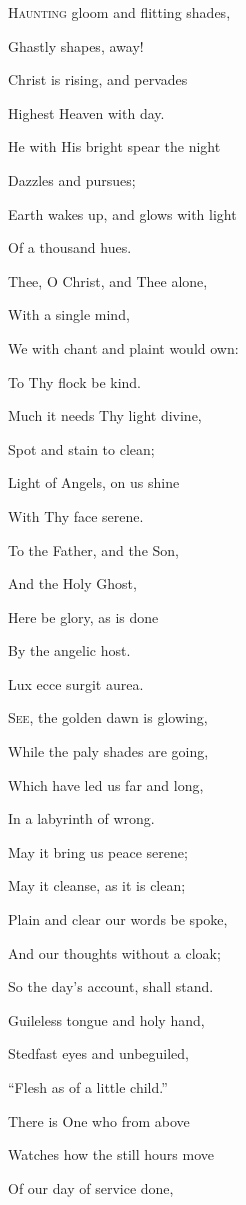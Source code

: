 H\textsc{aunting} gloom and flitting shades,

Ghastly shapes, away!

Christ is rising, and pervades

Highest Heaven with day.

He with His bright spear the night

Dazzles and pursues;

Earth wakes up, and glows with light

Of a thousand hues.

Thee, O Christ, and Thee alone,

With a single mind,

We with chant and plaint would own:

To Thy flock be kind. 

Much it needs Thy light divine,

Spot and stain to clean;

Light of Angels, on us shine

With Thy face serene.

To the Father, and the Son,

And the Holy Ghost,

Here be glory, as is done

By the angelic host.


Lux ecce surgit aurea.

S\textsc{ee}, the golden dawn is glowing,

While the paly shades are going,

Which have led us far and long,

In a labyrinth of wrong.

May it bring us peace serene;

May it cleanse, as it is clean;

Plain and clear our words be spoke,

And our thoughts without a cloak;

So the day's account, shall stand.

Guileless tongue and holy hand,

Stedfast eyes and unbeguiled,

``Flesh as of a little child.'' 

There is One who from above

Watches how the still hours move

Of our day of service done,

